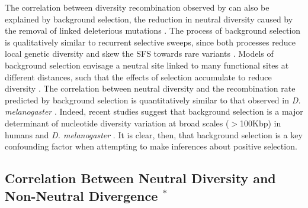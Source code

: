The correlation between diversity recombination observed by \cite{RN114} can also be explained by background selection, the reduction in neutral diversity caused by the removal of linked deleterious mutations \citep{RN132}. The process of background selection is qualitatively similar to recurrent selective sweeps, since both processes reduce local genetic diversity \citep{RN110} and skew the SFS towards rare variants \citep{RN287,RN133}. Models of background selection envisage a neutral site linked to many functional sites at different distances, such that the effects of selection accumulate to reduce diversity \citep{RN206, RN157}. The correlation between neutral diversity and the recombination rate predicted by background selection is quantitatively similar to that observed in \emph{D. melanogaster} \citep{RN281}. Indeed, recent studies suggest that background selection is a major determinant of nucleotide diversity variation at broad scales ($>$100Kbp) in humans \cite{RN120} and \emph{D. melanogaster} \citep{RN288, RN116}. It is clear, then, that background selection is a key confounding factor when attempting to make inferences about positive selection.
 
\subsection[Correlations Between Neutral Diversity and Non-Neutral Divergence]{Correlation Between Neutral Diversity and Non-Neutral Divergence $^*$}

